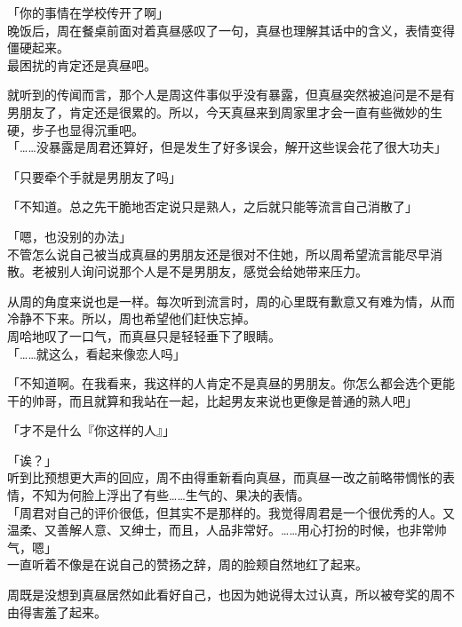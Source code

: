 \vspace{2\baselineskip}

「你的事情在学校传开了啊」\\

晚饭后，周在餐桌前面对着真昼感叹了一句，真昼也理解其话中的含义，表情变得僵硬起来。\\

最困扰的肯定还是真昼吧。

就听到的传闻而言，那个人是周这件事似乎没有暴露，但真昼突然被追问是不是有男朋友了，肯定还是很累的。所以，今天真昼来到周家里才会一直有些微妙的生硬，步子也显得沉重吧。\\

「……没暴露是周君还算好，但是发生了好多误会，解开这些误会花了很大功夫」

「只要牵个手就是男朋友了吗」

「不知道。总之先干脆地否定说只是熟人，之后就只能等流言自己消散了」

「嗯，也没别的办法」\\

不管怎么说自己被当成真昼的男朋友还是很对不住她，所以周希望流言能尽早消散。老被别人询问说那个人是不是男朋友，感觉会给她带来压力。

从周的角度来说也是一样。每次听到流言时，周的心里既有歉意又有难为情，从而冷静不下来。所以，周也希望他们赶快忘掉。\\

周哈地叹了一口气，而真昼只是轻轻垂下了眼睛。\\

「……就这么，看起来像恋人吗」

「不知道啊。在我看来，我这样的人肯定不是真昼的男朋友。你怎么都会选个更能干的帅哥，而且就算和我站在一起，比起男友来说也更像是普通的熟人吧」

「才不是什么『你这样的人』」

「诶？」\\

听到比预想更大声的回应，周不由得重新看向真昼，而真昼一改之前略带惆怅的表情，不知为何脸上浮出了有些……生气的、果决的表情。\\

「周君对自己的评价很低，但其实不是那样的。我觉得周君是一个很优秀的人。又温柔、又善解人意、又绅士，而且，人品非常好。……用心打扮的时候，也非常帅气，嗯」\\

一直听着不像是在说自己的赞扬之辞，周的脸颊自然地红了起来。

周既是没想到真昼居然如此看好自己，也因为她说得太过认真，所以被夸奖的周不由得害羞了起来。\\

